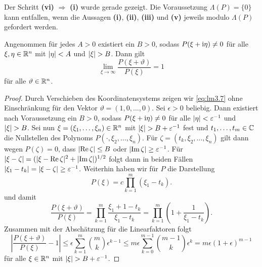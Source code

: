  Der Schritt {\bf (vi)} $\Rightarrow$ {\bf(i)} wurde gerade gezeigt. Die Voraussetzung $\Lambda(P)=\{0\}$ kann entfallen, wenn die Aussagen {\bf (i)}, {\bf (ii)}, {\bf (iii)}
 und {\bf (v)} jeweils modulo $\Lambda(P)$ gefordert werden.


\begin{lem}
Angenommen für jedes $A>0$ existiert ein $B>0$, sodass $P(\xi+\mathrm i\eta)\neq 0$ für alle $\xi,\eta\in\mathbb R^n$ mit $\lvert\eta\rvert<A$ und $\lvert\xi\rvert>B$. Dann gilt
\begin{equation}
\lim_{\xi\to\infty}\dfrac{P(\xi+\vartheta)}{P(\xi)}=1 \label{eq:lm3.7}
\end{equation}
für alle $ \vartheta\in\mathbb R^n$.
\end{lem}
\begin{proof}
Durch Verschieben des Koordinatensystems zeigen wir \ref{eq:lm3.7} ohne Einschränkung für den Vektor $\vartheta=(1,0,\ldots,0)$. Sei $\epsilon > 0$ beliebig. Dann existiert nach Voraussetzung ein $B>0$, sodass $P(\xi+\mathrm i\eta)\neq 0$ für alle $\lvert\eta\rvert < \varepsilon^{-1}$ und $\lvert\xi\rvert>B$. Sei nun $\xi=(\xi_1,\ldots,\xi_n)\in\mathbb R^n$ mit $\lvert\xi\rvert>B+\varepsilon^{-1}$ fest und $t_1,\ldots,t_m\in \mathbb C$ die Nullstellen des Polynoms $P(\cdot,\xi_2,\ldots,\xi_n)$. Für $\zeta=(t_k,\xi_2,\ldots,\xi_n)$ gilt dann wegen $P(\zeta)=0$, dass $\lvert\operatorname{Re} \zeta\rvert \leq B$ oder $\lvert\operatorname{Im} \zeta\rvert \geq \varepsilon^{-1}$. Für $\lvert\xi-\zeta\rvert= (\lvert\xi-\operatorname{Re} \zeta\rvert^2+\lvert\operatorname{Im} \zeta\rvert)^{1/2}$ folgt dann in beiden Fällen $\lvert\xi_1-t_k\rvert=\lvert\xi-\zeta\rvert\geq \varepsilon^{-1}$. Weiterhin haben wir für $P$ die Darstellung
\begin{equation}
P(\xi)=c\prod_{k=1}^m (\xi_1-t_k).
\end{equation}
und damit
\begin{equation}
\dfrac{P(\xi+\vartheta)}{P(\xi)}=\prod_{k=1}^m \dfrac{\xi_1+1-t_k}{\xi_1-t_k}=\prod_{k=1}^m\left( 1+\dfrac{1}{\xi_1-t_k} \right).
\end{equation}
Zusammen mit der Abschätzung für die Linearfaktoren folgt
\begin{equation}
\left|\dfrac{P(\xi+\vartheta)}{P(\xi)}-1\right|\leq \epsilon\sum_{k=1}^m \binom{m}{k}\epsilon^{k-1} \leq m\epsilon  \sum_{k=0}^{m-1}\binom{m-1}{k}\epsilon^k = m\epsilon(1+\epsilon)^{m-1}
\end{equation}
für alle $\xi \in\mathbb R^n$ mit $\lvert\xi\rvert>B+\varepsilon^{-1}$.
\end{proof}
